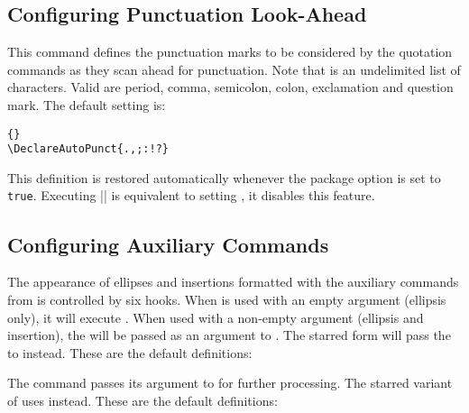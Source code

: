 \documentclass{ltxdockit}[2010/09/26]
\begin{document}
\subsection{Configuring Punctuation Look-Ahead}
\label{cfg:dap}

\begin{ltxsyntax}


This command defines the punctuation marks to be considered by the quotation commands as they scan ahead for punctuation. Note that  is an undelimited list of characters. Valid  are period, comma, semicolon, colon, exclamation and question mark. The default setting is:

\begin{lstlisting}[style=latex]{}
\DeclareAutoPunct{.,;:!?}
\end{lstlisting}
%
This definition is restored automatically whenever the  package option is set to \texttt{true}. Executing |\DeclareAutoPunctuation{}| is equivalent to setting , \ie it disables this feature.

\end{ltxsyntax}

\subsection{Configuring Auxiliary Commands}
\label{cfg:elp}

The appearance of ellipses and insertions formatted with the auxiliary commands from  is controlled by six hooks. When  is used with an empty argument (ellipsis only), it will execute . When used with a non-empty  argument (ellipsis and insertion), the  will be passed as an argument to . The starred form will pass the  to  instead. These are the default definitions:

\begin{ltxcode}[showspaces=true]
\newcommand{<<\mktextelp>>}{[\textellipsis\unkern]}
\newcommand{<<\mktextelpins>>}[1]{[\textellipsis\unkern] [#1]}
\newcommand{<<\mktextinselp>>}[1]{[#1] [\textellipsis\unkern]}
\end{ltxcode}
%
The  command passes its  argument to  for further processing. The starred variant of  uses  instead. These are the default definitions:
\end{document}
